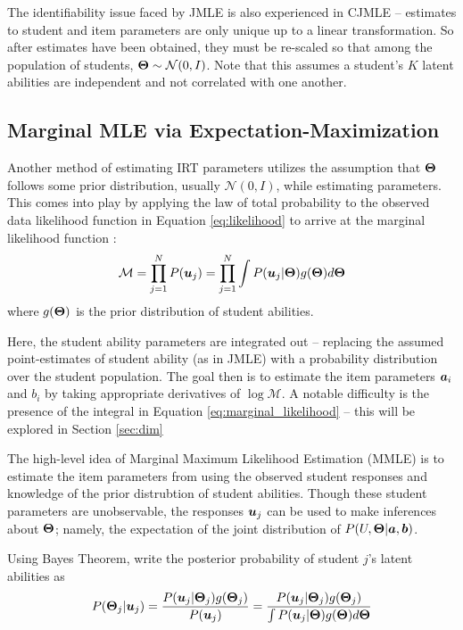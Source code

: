 The identifiability issue faced by JMLE is also experienced in CJMLE -- estimates to student and item parameters are only unique up to a linear transformation. So after estimates have been obtained, they must be re-scaled so that among the population of students, $\boldsymbol{\Theta} \sim \mathcal{N}(0,I)$. Note that this assumes a student's $K$ latent abilities are independent and not correlated with one another.


\subsection{Marginal MLE via Expectation-Maximization}\label{sec:em}
Another method of estimating IRT parameters utilizes the assumption that $\boldsymbol{\Theta}$ follows some prior distribution, usually $\mathcal{N}(0,I)$, while estimating parameters. This comes into play by applying the law of total probability to the observed data likelihood function in Equation \ref{eq:likelihood} to arrive at the marginal likelihood function \cite{baker_kim2004}:
\begin{equation}
  \mathcal{M} = \prod_{j=1}^N P(\boldsymbol{u}_j) = \prod_{j=1}^N \int P(\boldsymbol{u}_j | \boldsymbol{\Theta}) g(\boldsymbol{\Theta}) d\boldsymbol{\Theta}
  \label{eq:marginal_likelihood}
\end{equation}
where $g(\boldsymbol{\Theta})$ is the prior distribution of student abilities.

Here, the student ability parameters are integrated out -- replacing the assumed point-estimates of student ability (as in JMLE) with a probability distribution over the student population. The goal then is to estimate the item parameters $\boldsymbol{a}_i$ and $b_i$ by taking appropriate derivatives of $\log \mathcal{M}$. A notable difficulty is the presence of the integral in Equation \ref{eq:marginal_likelihood} -- this will be explored in Section \ref{sec:dim}

The high-level idea of Marginal Maximum Likelihood Estimation (MMLE) is to estimate the item parameters from using the observed student responses and knowledge of the prior distrubtion of student abilities. Though these student parameters are unobservable, the responses $\boldsymbol{u}_j$ can be used to make inferences about $\boldsymbol{\Theta}$; namely, the expectation of the joint distribution of $P(U, \boldsymbol{\Theta} | \boldsymbol{a}, \boldsymbol{b})$.

Using Bayes Theorem, write the posterior probability of student $j$'s latent abilities as
\begin{equation}
  P(\boldsymbol{\Theta}_j | \boldsymbol{u}_j) = \frac{P(\boldsymbol{u}_j | \boldsymbol{\Theta}_j) g(\boldsymbol{\Theta}_j)}{P(\boldsymbol{u}_j)} = \frac{P(\boldsymbol{u}_j | \boldsymbol{\Theta}_j) g(\boldsymbol{\Theta}_j)}{\int P(\boldsymbol{u}_j | \boldsymbol{\Theta})g(\boldsymbol{\Theta})d \boldsymbol{\Theta}}
  \label{eq:bayes}
\end{equation}


